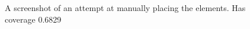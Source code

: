 \documentclass{article}
\begin{document}
\begin{figure}
  \caption{A screenshot of an attempt at manually placing the elements. Has coverage 0.6829}
  \label{fig:Dynamic Placement 2}
\end{figure}

\end{document}
